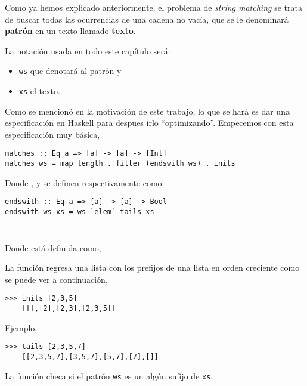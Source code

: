 Como ya hemos explicado anteriormente, el problema de \textit{string matching} se trata de buscar
todas las ocurrencias de una cadena no vacía, que se le denominará \textbf{patrón} en un texto
llamado \textbf{texto}. 

La notación usada en todo este capítulo será:
\begin{itemize}
    \item \texttt{ws} que denotará al patrón y
    \item \texttt{xs} el texto.
\end{itemize}

Como se mencionó en la motivación de este trabajo, lo que se hará es dar una especificación en
Haskell para despues irlo ``optimizando''. Empecemos con esta especificación muy básica,

\begin{verbatim}
matches :: Eq a => [a] -> [a] -> [Int]
matches ws = map length . filter (endswith ws) . inits
\end{verbatim}

Donde ,  y  se definen respectivamente como:

\begin{verbatim}
endswith :: Eq a => [a] -> [a] -> Bool
endswith ws xs = ws `elem` tails xs
\end{verbatim}

\inputminted{haskell}{definiciones/inits.hs}

\inputminted{haskell}{definiciones/tails.hs}

Donde  está definida como, %

La función  regresa una lista con los prefijos de una lista en orden creciente como se 
puede ver a continuación,

\begin{verbatim}
>>> inits [2,3,5]
    [[],[2],[2,3],[2,3,5]]
\end{verbatim}

Ejemplo,

\begin{verbatim}
>>> tails [2,3,5,7]
    [[2,3,5,7],[3,5,7],[5,7],[7],[]]
\end{verbatim}

La función  checa si el patrón \texttt{ws} es un algún sufijo de \texttt{xs}.

